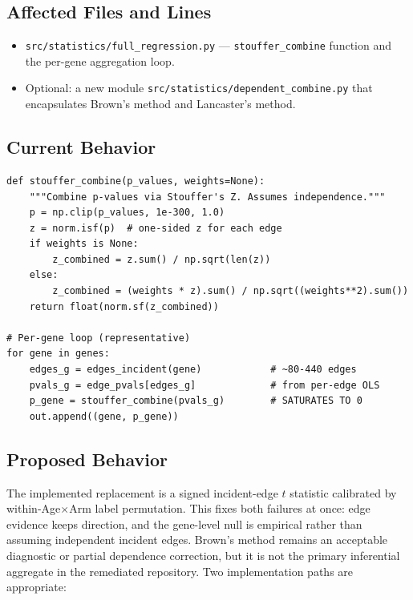\documentclass[11pt]{article}
\newcommand{\code}[1]{\texttt{#1}}
\begin{document}
\subsection{Affected Files and Lines}

\begin{itemize}[leftmargin=*]
\item \code{src/statistics/full\_regression.py} --- \code{stouffer\_combine} function and the per-gene aggregation loop.
\item Optional: a new module \code{src/statistics/dependent\_combine.py} that encapsulates Brown's method and Lancaster's method.
\end{itemize}

\subsection{Current Behavior}

\begin{lstlisting}[style=pythonstyle,caption={Current Stouffer aggregation (representative excerpt).}]
def stouffer_combine(p_values, weights=None):
    """Combine p-values via Stouffer's Z. Assumes independence."""
    p = np.clip(p_values, 1e-300, 1.0)
    z = norm.isf(p)  # one-sided z for each edge
    if weights is None:
        z_combined = z.sum() / np.sqrt(len(z))
    else:
        z_combined = (weights * z).sum() / np.sqrt((weights**2).sum())
    return float(norm.sf(z_combined))

# Per-gene loop (representative)
for gene in genes:
    edges_g = edges_incident(gene)            # ~80-440 edges
    pvals_g = edge_pvals[edges_g]             # from per-edge OLS
    p_gene = stouffer_combine(pvals_g)        # SATURATES TO 0
    out.append((gene, p_gene))
\end{lstlisting}

\subsection{Proposed Behavior}

The implemented replacement is a signed incident-edge $t$ statistic calibrated by within-Age$\times$Arm label permutation. This fixes both failures at once: edge evidence keeps direction, and the gene-level null is empirical rather than assuming independent incident edges. Brown's method remains an acceptable diagnostic or partial dependence correction, but it is not the primary inferential aggregate in the remediated repository. Two implementation paths are appropriate:
\end{document}
